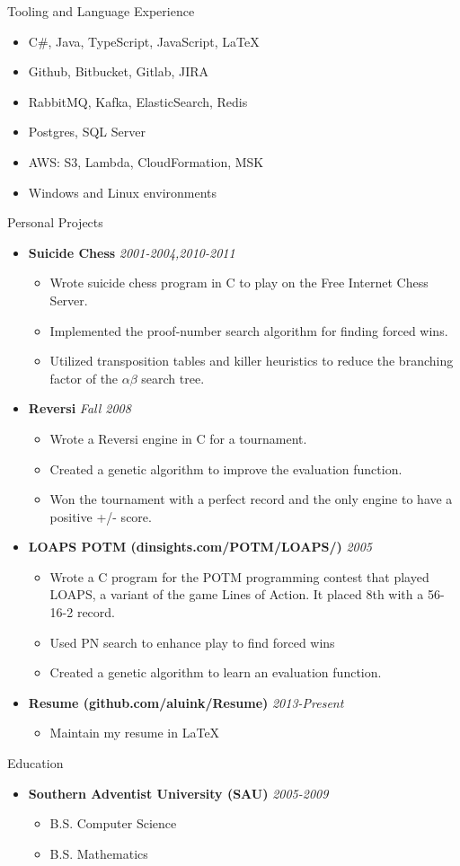 \documentclass[11pt,oneside]{article}
\newenvironment{ressection}[1]{
	\vspace{4pt}
	{\fontfamily{phv}\selectfont\Large#1}
	\begin{itemize}
	\vspace{3pt}
}{
	\end{itemize}
}
\newcommand{\resitem}[1]{
	\vspace{-4pt}
	\item \begin{flushleft} #1 \end{flushleft}
}
\newcommand{\ressubitem}[1]{
	\vspace{-1pt}
	\item \begin{flushleft} #1 \end{flushleft}
}
\newcommand{\resbigitemb}[2]{
	\vspace{-5pt}
	\item{\textbf{#1} \hfill \textit{#2}}
}
\newenvironment{resdateditem}[2]{
	\resbigitemb{#1}{#2}
	\vspace{-2pt}
	\begin{itemize}
}{
	\end{itemize}
}
\begin{document}
\begin{ressection}{Tooling and Language Experience}
	\resitem{C\#, Java, TypeScript, JavaScript, \LaTeX}
	\resitem{Github, Bitbucket, Gitlab, JIRA}
	\resitem{RabbitMQ, Kafka, ElasticSearch, Redis}
	\resitem{Postgres, SQL Server}
	\resitem{AWS: S3, Lambda, CloudFormation, MSK}
	\resitem{Windows and Linux environments}
\end{ressection}

\begin{ressection}{Personal Projects}
  \begin{resdateditem}{Suicide Chess}{2001-2004,2010-2011}
    \ressubitem{Wrote suicide chess program in C to play on the Free Internet Chess Server.}
    \ressubitem{Implemented the proof-number search algorithm for finding forced wins.}
    \ressubitem{Utilized transposition tables and killer heuristics to reduce the branching factor of the $\alpha\beta$ search tree.}
  \end{resdateditem}

  \begin{resdateditem}{Reversi}{Fall 2008}
    \ressubitem{Wrote a Reversi engine in C for a tournament.}
		\ressubitem{Created a genetic algorithm to improve the evaluation function.}
		\ressubitem{Won the tournament with a perfect record and the only engine to have a positive +/- score.}
  \end{resdateditem}

  \begin{resdateditem}{LOAPS POTM (dinsights.com/POTM/LOAPS/)}{2005}
    \ressubitem{Wrote a C program for the POTM programming contest that
    played LOAPS, a variant of the game Lines of Action.  It placed 8th
    with a 56-16-2 record.}
    \ressubitem{Used PN search to enhance play to find forced wins}
    \ressubitem{Created a genetic algorithm to learn an evaluation function.}
  \end{resdateditem}

  \begin{resdateditem}{Resume (github.com/aluink/Resume)}{2013-Present}
	\ressubitem{Maintain my resume in \LaTeX}
  \end{resdateditem}
\end{ressection}

\begin{ressection}{Education}
	\begin{resdateditem}{Southern Adventist University (SAU)}{2005-2009}
		\resitem{B.S. Computer Science}
		\resitem{B.S. Mathematics}
	\end{resdateditem}
\end{ressection}
\end{document}
